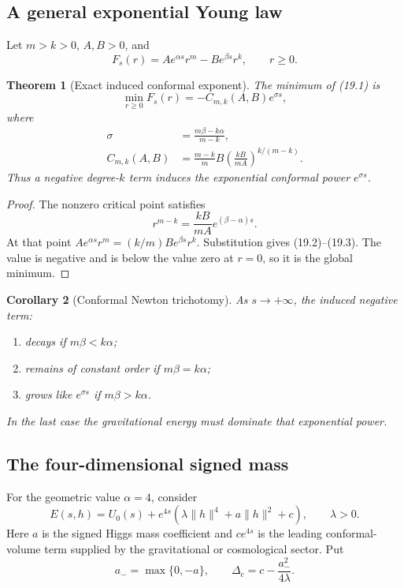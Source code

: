 \documentclass[11pt]{article}
\newtheorem{theorem}{Theorem}[section]
\newtheorem{corollary}[theorem]{Corollary}
\theoremstyle{remark}
\begin{document}
\subsection{A general exponential Young law}

Let \(m>k>0\), \(A,B>0\), and
\[
 F_s(r)=Ae^{\alpha s}r^m-Be^{\beta s}r^k,
 \qquad r\geq0.                                    \tag{19.1}
\]

\begin{theorem}[Exact induced conformal exponent]
\label{thm:v17v19-young}
The minimum of (19.1) is
\[
 \min_{r\geq0}F_s(r)
 =-C_{m,k}(A,B)e^{\sigma s},                       \tag{19.2}
\]
where
\[
\begin{aligned}
 \sigma&=\frac{m\beta-k\alpha}{m-k},\\
 C_{m,k}(A,B)
 &=\frac{m-k}{m}B
 \left(\frac{kB}{mA}\right)^{k/(m-k)}.             \tag{19.3}
\end{aligned}
\]
Thus a negative degree-\(k\) term induces the exponential
conformal power \(e^{\sigma s}\).
\end{theorem}

\begin{proof}
The nonzero critical point satisfies
\[
 r^{m-k}=\frac{kB}{mA}e^{(\beta-\alpha)s}.
\]
At that point
\(Ae^{\alpha s}r^m=(k/m)Be^{\beta s}r^k\).
Substitution gives (19.2)--(19.3).  The value is negative and is
below the value zero at \(r=0\), so it is the global minimum.
\end{proof}

\begin{corollary}[Conformal Newton trichotomy]
\label{cor:v17v19-trichotomy}
As \(s\to+\infty\), the induced negative term:
\begin{enumerate}
\item decays if \(m\beta<k\alpha\);
\item remains of constant order if \(m\beta=k\alpha\);
\item grows like \(e^{\sigma s}\) if \(m\beta>k\alpha\).
\end{enumerate}
In the last case the gravitational energy must dominate that
exponential power.
\end{corollary}

\subsection{The four-dimensional signed mass}

For the geometric value \(\alpha=4\), consider
\[
 E(s,h)
 =U_0(s)+e^{4s}
 \left(\lambda\|h\|^4+a\|h\|^2+c\right),
 \qquad\lambda>0.                                  \tag{19.4}
\]
Here \(a\) is the signed Higgs mass coefficient and \(ce^{4s}\) is
the leading conformal-volume term supplied by the gravitational or
cosmological sector.  Put
\[
 a_-=\max\{0,-a\},\qquad
 \Delta_c=c-\frac{a_-^2}{4\lambda}.                \tag{19.5}
\]
\end{document}
